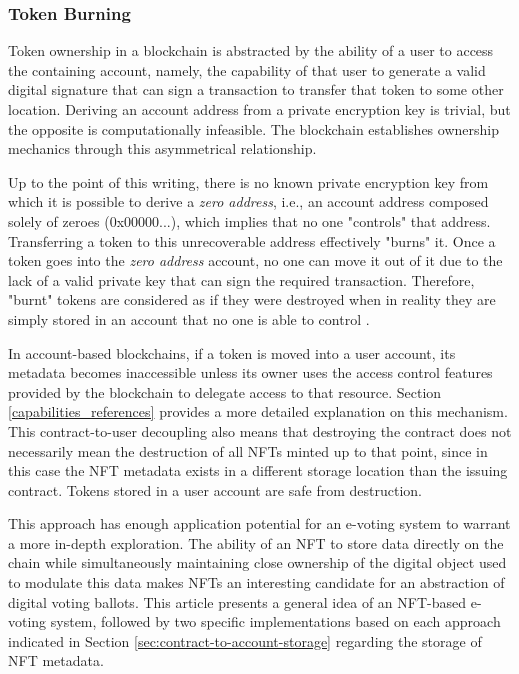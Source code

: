 \documentclass[../3_VotingAndNFTs.tex]{subfiles}
\begin{document}
\subsubsection{Token Burning}
Token ownership in a blockchain is abstracted by the ability of a user to access the containing account, namely, the capability of that user to generate a valid digital signature that can sign a transaction to transfer that token to some other location. Deriving an account address from a private encryption key is trivial, but the opposite is computationally infeasible. The blockchain establishes ownership mechanics through this asymmetrical relationship.
\par
Up to the point of this writing, there is no known private encryption key from which it is possible to derive a \textit{zero address}, i.e., an account address composed solely of zeroes (0x00000...), which implies that no one "controls" that address. Transferring a token to this unrecoverable address effectively "burns" it. Once a token goes into the \textit{zero address} account, no one can move it out of it due to the lack of a valid private key that can sign the required transaction. Therefore, "burnt" tokens are considered as if they were destroyed when in reality they are simply stored in an account that no one is able to control \cite{Antonopoulos2018}.
\par
In account-based blockchains, if a token is moved into a user account, its metadata becomes inaccessible unless its owner uses the access control features provided by the blockchain to delegate access to that resource. Section \ref{capabilities_references} provides a more detailed explanation on this mechanism. This contract-to-user decoupling also means that destroying the contract does not necessarily mean the destruction of all NFTs minted up to that point, since in this case the NFT metadata exists in a different storage location than the issuing contract. Tokens stored in a user account are safe from destruction.
\par
This approach has enough application potential for an e-voting system to warrant a more in-depth exploration. The ability of an NFT to store data directly on the chain while simultaneously maintaining close ownership of the digital object used to modulate this data makes NFTs an interesting candidate for an abstraction of digital voting ballots. This article presents a general idea of an NFT-based e-voting system, followed by two specific implementations based on each approach indicated in Section \ref{sec:contract-to-account-storage} regarding the storage of NFT metadata.
\end{document}
